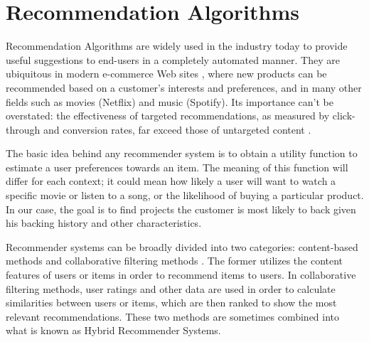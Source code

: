 \documentclass[cic,tc,english]{iiufrgs}
\begin{document}



\chapter{Recommendation Algorithms}
Recommendation Algorithms are widely used in the industry today to provide useful suggestions to end-users in a completely automated manner. They are ubiquitous in modern e-commerce Web sites \cite{Schafer2001}, where new products can be recommended based on a customer's interests and preferences, and in many other fields such as movies (Netflix) and music (Spotify). Its importance can't be overstated: the effectiveness of targeted recommendations, as measured by click-through and conversion rates, far exceed those of untargeted content \cite{Linden2003}.

The basic idea behind any recommender system is to obtain a utility function to estimate a user preferences towards an item. The meaning of this function will differ for each context; it could mean how likely a user will want to watch a specific movie or listen to a song, or the likelihood of buying a particular product. In our case, the goal is to find projects the customer is most likely to back given his backing history and other characteristics. 

Recommender systems can be broadly divided into two categories: content-based methods and collaborative filtering methods \cite{Rakesh2016}.
The former utilizes the content features of users or items in order to recommend items to users. In collaborative filtering methods, user ratings and other data are used in order to calculate similarities between users or items, which are then ranked to show the most relevant recommendations. These two methods are sometimes combined into what is known as Hybrid Recommender Systems.
\end{document}
